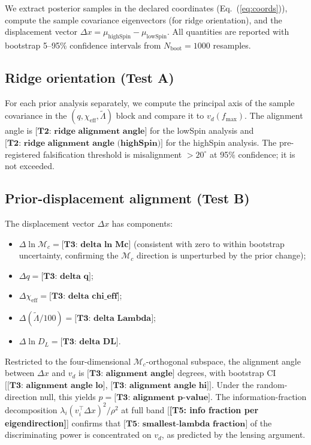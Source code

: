 \documentclass[twocolumn,prd,showpacs,superscriptaddress]{revtex4-2}
\newcommand{\Mchirp}{\mathcal{M}_c}
\newcommand{\Lambdatilde}{\tilde{\Lambda}}
\newcommand{\chieff}{\chi_{\text{eff}}}
\newcommand{\Dl}{D_L}
\newcommand{\vd}{v_{d}}          %
\newcommand{\rhosq}{\rho^{2}}    %
\newcommand{\eqnref}[1]{Eq.~(\ref{eq:#1})}
\newcommand{\manifest}[1]{\textbf{[#1]}}
\begin{document}
We extract posterior samples in the declared coordinates
(\eqnref{coords}), compute the sample covariance eigenvectors (for
ridge orientation), and the displacement vector $\Delta x = \mu_{\text{highSpin}} - \mu_{\text{lowSpin}}$.
All quantities are reported with bootstrap 5--95\% confidence
intervals from $N_{\text{boot}} = 1000$ resamples.

\subsection{Ridge orientation (Test A)}

For each prior analysis separately, we compute the principal axis of
the sample covariance in the $(q, \chieff, \Lambdatilde)$ block and
compare it to $\vd(f_{\text{max}})$.  The alignment angle is
$\manifest{T2: ridge alignment angle}$ for the lowSpin analysis and
$\manifest{T2: ridge alignment angle (highSpin)}$ for the highSpin
analysis.  The pre-registered falsification threshold is
misalignment $> 20^\circ$ at 95\% confidence; it is not exceeded.

\subsection{Prior-displacement alignment (Test B)}

The displacement vector $\Delta x$ has components:
\begin{itemize}
  \item $\Delta \ln \Mchirp = \manifest{T3: delta ln Mc}$ (consistent
  with zero to within bootstrap uncertainty, confirming the
  $\mathcal{M}_c$ direction is unperturbed by the prior change);
  \item $\Delta q = \manifest{T3: delta q}$;
  \item $\Delta \chieff = \manifest{T3: delta chi_eff}$;
  \item $\Delta (\Lambdatilde/100) = \manifest{T3: delta Lambda}$;
  \item $\Delta \ln \Dl = \manifest{T3: delta DL}$.
\end{itemize}
Restricted to the four-dimensional $\mathcal{M}_c$-orthogonal subspace,
the alignment angle between $\Delta x$ and $\vd$ is
$\manifest{T3: alignment angle}$ degrees, with bootstrap CI
$[\manifest{T3: alignment angle lo}$, $\manifest{T3: alignment angle hi}]$.
Under the random-direction null, this yields
$p = \manifest{T3: alignment p-value}$.
The information-fraction decomposition
$\lambda_i(v_i^{\top}\Delta x)^2 / \rhosq$ at full band
[\manifest{T5: info fraction per eigendirection}] confirms
that $\manifest{T5: smallest-lambda fraction}$ of the discriminating
power is concentrated on $\vd$, as predicted by the lensing argument.
\end{document}
